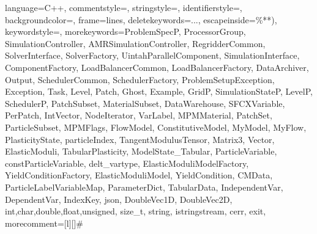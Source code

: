 {
  language=C++,
  commentstyle=\color{dkgreen}\upshape,   
  stringstyle=\color{red},
  identifierstyle=\color{DarkBlue},
  backgroundcolor=\color{background},
  frame=lines,
  deletekeywords={...},
  escapeinside={\%*}{*)},
  keywordstyle=\color{Brickred},
  morekeywords={ProblemSpecP, ProcessorGroup, SimulationController,%
                AMRSimulationController, RegridderCommon, SolverInterface,%
                SolverFactory, UintahParallelComponent, SimulationInterface,%
                ComponentFactory, LoadBalancerCommon, LoadBalancerFactory,%
                DataArchiver, Output, SchedulerCommon, SchedulerFactory,%
                ProblemSetupException, Exception,%
                Task, Level, Patch, Ghost, Example,%
                GridP, SimulationStateP, LevelP, SchedulerP,%
                PatchSubset, MaterialSubset, DataWarehouse,%
                SFCXVariable, PerPatch, IntVector, NodeIterator,%
                VarLabel, MPMMaterial, PatchSet, ParticleSubset,%
                MPMFlags, FlowModel, ConstitutiveModel, MyModel, MyFlow, PlasticityState,%
                particleIndex, TangentModulusTensor, Matrix3, Vector,
                ElasticModuli, TabularPlasticity, ModelState_Tabular, ParticleVariable,
                constParticleVariable, delt_vartype, ElasticModuliModelFactory,%
                YieldConditionFactory, ElasticModuliModel, YieldCondition, CMData,
                ParticleLabelVariableMap, ParameterDict, TabularData, IndependentVar,
                DependentVar, IndexKey, json, DoubleVec1D, DoubleVec2D,
                int,char,double,float,unsigned, size_t,%
                string, istringstream, cerr, exit}, 
  morecomment=[l][\color{magenta}]{\#}
}




\RequirePackage{tikz}
\usetikzlibrary{shadings,shadows}
\usetikzlibrary{decorations.pathmorphing}
\usetikzlibrary{patterns}
\usetikzlibrary{intersections}
\usetikzlibrary{calc}

